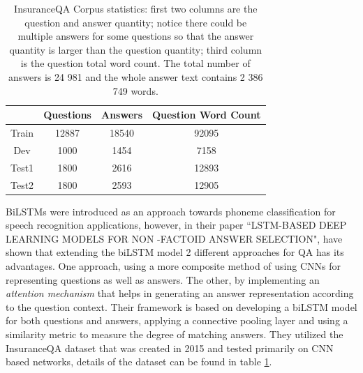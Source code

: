 \documentclass[a4paper,12pt]{report}
\begin{document}
             \begin{table}[h!]
              \centering
                \begin{tabular}{|c|c|c|c|}
                    \hline
                     & Questions & Answers & Question Word Count \\
                    \hline
                    Train & 12887 & 18540 & 92095 \\
                    \hline
                    Dev & 1000 & 1454& 7158 \\
                    \hline
                    Test1 & 1800 & 2616 & 12893 \\
                    \hline
                    Test2 & 1800 & 2593 & 12905 \\
                    \hline
                \end{tabular}
                \caption{InsuranceQA Corpus statistics: first two columns are the question and answer quantity; notice there could be multiple answers for some questions so that the answer quantity is larger than the question quantity; third column is the question total word count. The total number of answers is 24 981 and the whole answer text contains 2 386 749 words\citep{lstmInsuranceQA}.}\label{lstmInsuranceQATable}
            \end{table}

            BiLSTMs were introduced as an approach towards phoneme classification for speech recognition applications, however, in their paper ``LSTM-BASED DEEP LEARNING MODELS FOR NON -FACTOID ANSWER SELECTION", \citep{lstmhaighextractive} have shown that extending the biLSTM model 2 different approaches for QA has its advantages. One approach, using a more composite method of using CNNs for representing questions as well as answers. The other, by implementing an \textit{attention mechanism} that helps in generating an answer representation according to the question context.
            Their framework is based on developing a biLSTM model for both questions and answers, applying a connective pooling layer and using a similarity metric to measure the degree of matching answers. They utilized the InsuranceQA\citep{lstmInsuranceQA} dataset that was created in 2015 and tested primarily on CNN based networks, details of the dataset can be found in table \ref{lstmInsuranceQATable}.
\end{document}
